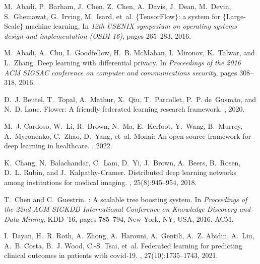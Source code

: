\documentclass[11pt]{article}
\begin{document}
%
%

\begin{thebibliography}{10}

M.~Abadi, P.~Barham, J.~Chen, Z.~Chen, A.~Davis, J.~Dean, M.~Devin,
  S.~Ghemawat, G.~Irving, M.~Isard, et~al.
\newblock $\{$TensorFlow$\}$: a system for $\{$Large-Scale$\}$ machine
  learning.
\newblock In {\em 12th USENIX symposium on operating systems design and
  implementation (OSDI 16)}, pages 265--283, 2016.

M.~Abadi, A.~Chu, I.~Goodfellow, H.~B. McMahan, I.~Mironov, K.~Talwar, and
  L.~Zhang.
\newblock Deep learning with differential privacy.
\newblock In {\em Proceedings of the 2016 ACM SIGSAC conference on computer and
  communications security}, pages 308--318, 2016.

D.~J. Beutel, T.~Topal, A.~Mathur, X.~Qiu, T.~Parcollet, P.~P. de~Gusm{\~a}o,
  and N.~D. Lane.
\newblock Flower: A friendly federated learning research framework.
, 2020.

M.~J. Cardoso, W.~Li, R.~Brown, N.~Ma, E.~Kerfoot, Y.~Wang, B.~Murrey,
  A.~Myronenko, C.~Zhao, D.~Yang, et~al.
\newblock Monai: An open-source framework for deep learning in healthcare.
, 2022.

K.~Chang, N.~Balachandar, C.~Lam, D.~Yi, J.~Brown, A.~Beers, B.~Rosen, D.~L.
  Rubin, and J.~Kalpathy-Cramer.
\newblock Distributed deep learning networks among institutions for medical
  imaging.
,
  25(8):945--954, 2018.

T.~Chen and C.~Guestrin.
: A scalable tree boosting system.
\newblock In {\em Proceedings of the 22nd ACM SIGKDD International Conference
  on Knowledge Discovery and Data Mining}, KDD '16, pages 785--794, New York,
  NY, USA, 2016. ACM.

I.~Dayan, H.~R. Roth, A.~Zhong, A.~Harouni, A.~Gentili, A.~Z. Abidin, A.~Liu,
  A.~B. Costa, B.~J. Wood, C.-S. Tsai, et~al.
\newblock Federated learning for predicting clinical outcomes in patients with
  covid-19.
, 27(10):1735--1743, 2021.


\end{thebibliography}
\end{document}
